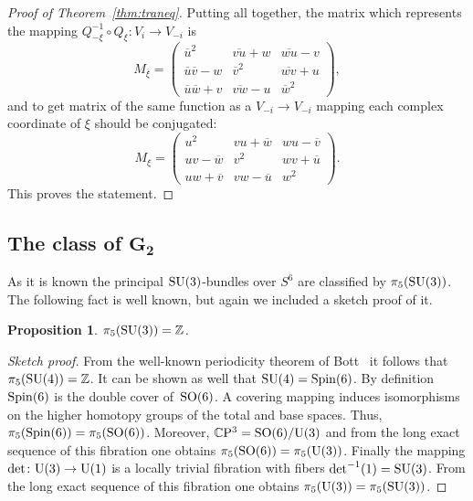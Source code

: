 \documentclass[10pt,a4paper]{amsart}
\numberwithin{equation}{section}
\newtheorem{Proposition}[Theorem]{Proposition}
 { \theoremstyle{definition}
\newtheorem{Definition}[Theorem]{Definition}
\newtheorem{Remark}[Theorem]{Remark} }
\newcommand{\SZ}{\mathbb{Z}} %
\newcommand{\SC}{\mathbb{C}} %
\begin{document}
\begin{proof}[Proof of Theorem~\ref{thm:traneq}]
 Putting all together, the matrix which represents the mapping $Q_{-\xi}^{-1}\circ Q_\xi\colon V_i \rightarrow V_{-i}$ is
 \[
 M_{\overline{\xi}}=
 \begin{pmatrix}
 \overline{u}^2 & \overline{vu} +w &\overline{wu} -v\\
 \overline{u}\overline{v}-w & \overline{v}^2 & \overline{wv}+u \\
 \overline{u}\overline{w}+v& \overline{vw}-u & \overline{w}^2
 \end{pmatrix},
 \]
 and to get matrix of the same function as a $V_{-i} \rightarrow V_{-i}$ mapping each complex coordinate of $\xi$ should be conjugated:
 \[
 M_\xi=
 \begin{pmatrix}
 u^2 & vu +\overline{w} &wu-\overline{v}\\
 uv-\overline{w} & v^2 & wv+\overline{u} \\
 uw+\overline{v}& vw-\overline{u} & w^2
 \end{pmatrix}.
 \]
 This proves the statement.
\end{proof}


\subsection[The class of $G_2$]{The class of $\boldsymbol{G_2}$}\label{section3.3}

As it is known the principal ${\rm SU}(3)$-bundles over $S^6$ are classified by $\pi_5({\rm SU}(3))$. The following fact is well known, but again we included a sketch proof of it.
\begin{Proposition} $\pi_5({\rm SU}(3)) =\SZ $.
\end{Proposition}
\begin{proof}[Sketch proof] From the well-known periodicity theorem of Bott~\cite{bott1959stable} it follows that $\pi_5({\rm SU}(4))\allowbreak =\SZ$.
 It can be shown as well that ${\rm SU}(4)={\rm Spin}(6)$. By definition ${\rm Spin}(6)$ is the double cover of~${\rm SO}(6)$. A covering mapping induces isomorphisms on the higher homotopy groups of the total and base spaces. Thus, $\pi_5({\rm Spin}(6))=\pi_5({\rm SO}(6))$. Moreover, $\SC{\rm P}^3={\rm SO}(6)/{\rm U}(3)$ and from the long exact sequence of this fibration one obtains $\pi_5({\rm SO}(6))=\pi_5({\rm U}(3))$. Finally the mapping $\det \colon {\rm U}(3) \rightarrow {\rm U}(1)$ is a locally trivial fibration with fibers $\det^{-1}(1)={\rm SU}(3)$. From the long exact sequence of this fibration one obtains $\pi_5({\rm U}(3))=\pi_5({\rm SU}(3))$.
\end{proof}
\end{document}
